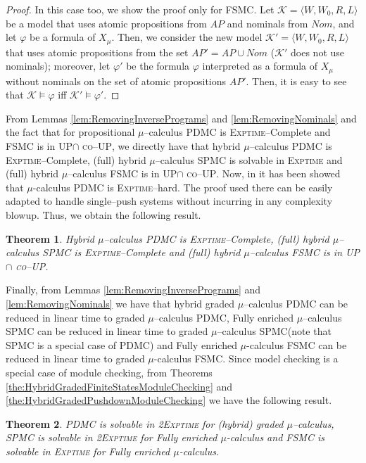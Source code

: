 \documentclass{LMCS}
\theoremstyle{plain}
\def \coUP          {\textsc{co--UP}\xspace}
\def \EXPTIME       {\textsc{Exptime}\xspace}
\def \FSMC          {\textsc{FSMC}\xspace}
\def \K             {\mathcal{K}}
\def \PDMC          {\textsc{PDMC}\xspace}
\def \SPMC          {\textsc{SPMC}\xspace}
\def \TWOEXPTIME    {\textsc{2Exptime}\xspace}
\def \UP            {{\sc UP}}
\def \UP            {\textsc{UP}\xspace}
\newtheorem{theorem}{Theorem}
\begin{document}
\begin{proof}
In this case too, we show the proof only for \FSMC. Let $\K = \langle W, W_0,
R, L \rangle$ be a model that uses atomic propositions from $AP$ and nominals
from $Nom$, and let $\varphi$ be a formula of $X_{\mu}$. Then, we consider the
new model $\K' = \langle W, W_0, R, L \rangle$ that uses atomic propositions
from the set $AP' = AP \cup Nom$ ($\K'$ does not use nominals); moreover, let
$\varphi'$ be the formula $\varphi$ interpreted as a formula of $X_{\mu}$
without nominals on the set of atomic propositions $AP'$. Then, it is easy to
see that $\K \models \varphi$ iff $\K' \models \varphi'$.
\end{proof}

From Lemmas \ref{lem:RemovingInversePrograms} and \ref{lem:RemovingNominals}
and the fact that for propositional $\mu$--calculus \PDMC is \EXPTIME--Complete
\cite{Wal96} and \FSMC is in \UP $\cap$ \coUP \cite{Wil01}, we directly have
that hybrid $\mu$--calculus \PDMC is \EXPTIME--Complete, (full) hybrid
$\mu$--calculus \SPMC is solvable in \EXPTIME and (full) hybrid $\mu$--calculus
\FSMC is in \UP $\cap$ \coUP. Now, in \cite{Wal96} it has been showed that
$\mu$-calculus \PDMC is \EXPTIME--hard. The proof used there can be easily
adapted to handle single--push systems without incurring in any complexity
blowup. Thus, we obtain the following result.

\begin{theorem}\label{the:FullHybridMuCalculusModelChecking}
Hybrid $\mu$--calculus \PDMC is \EXPTIME--Complete, (full) hybrid
$\mu$--calculus \SPMC is \EXPTIME--Complete and (full) hybrid $\mu$--calculus
\FSMC is in \UP $\cap$ \coUP.
\end{theorem}

Finally, from Lemmas \ref{lem:RemovingInversePrograms} and
\ref{lem:RemovingNominals} we have that hybrid graded $\mu$--calculus \PDMC can
be reduced in linear time to graded $\mu$--calculus \PDMC, Fully enriched
$\mu$--calculus \SPMC can be reduced in linear time to graded $\mu$--calculus
\SPMC (note that \SPMC is a special case of \PDMC) and Fully enriched
$\mu$-calculus \FSMC can be reduced in linear time to graded $\mu$-calculus
\FSMC. Since model checking is a special case of module checking, from Theorems
\ref{the:HybridGradedFiniteStatesModuleChecking} and
\ref{the:HybridGradedPushdownModuleChecking} we have the following result.

\begin{theorem}\label{the:ModelCheckingForFullyEnrichedMuCalculus}
\PDMC is solvable in \TWOEXPTIME for (hybrid) graded $\mu$--calculus, \SPMC is
solvable in \TWOEXPTIME for Fully enriched $\mu$-calculus and \FSMC is solvable
in \EXPTIME for Fully enriched $\mu$-calculus.
\end{theorem}



\end{document}
